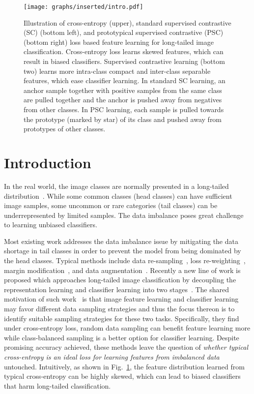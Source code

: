 \documentclass[final]{cvpr}
\begin{document}
\begin{figure}[t]
\begin{center}   
{
\texttt{[image: graphs/inserted/intro.pdf]}
}
\caption{Illustration of cross-entropy (upper), standard supervised contrastive (SC) (bottom left), and prototypical supervised contrastive (PSC) (bottom right) loss based feature learning for long-tailed image classification. Cross-entropy loss learns skewed features, which can result in biased classifiers. Supervised contrastive learning (bottom two) learns more intra-class compact and inter-class separable features, which ease classifier learning.  
In standard SC learning, an anchor sample together with positive samples from the same class are pulled together and the anchor is pushed away from negatives from other classes. In PSC learning, each sample is pulled towards the prototype (marked by star) of its class and pushed away from prototypes of other classes.} 
\label{fig:intro}
\end{center}
\end{figure}

\vspace*{-0.4cm}
\section{Introduction}

In the real world, the image classes are normally presented in a long-tailed distribution~\cite{openlt}. While some common classes (head classes) can have sufficient image samples, some uncommon or rare categories (tail classes) can be underrepresented by limited samples. The data imbalance poses great challenge to learning unbiased classifiers.


Most existing work addresses the data imbalance issue by mitigating the data shortage in tail classes in order to prevent the model from being dominated by the head classes. Typical methods include data re-sampling~\cite{imbalance1,imbalance2,imbalance3,SMOTE,more2016survey}, loss re-weighting~\cite{reweighting1,effnumber,ren18l2rw,equalloss}, margin modification~\cite{cao2019learning}, and data augmentation~\cite{m2m,feataug,GAMO}. Recently a new line of work is proposed which approaches long-tailed image classification by decoupling the representation learning and classifier learning into two stages~\cite{Decoupling,BBN,zhang2020balance}. The shared motivation of such work~\cite{Decoupling,BBN,zhang2020balance} is that image feature learning and classifier learning may favor different data sampling strategies and thus the focus thereon is to identify suitable sampling strategies for these two tasks. Specifically, they find under cross-entropy loss, random data sampling can benefit feature learning more while class-balanced sampling is a better option for classifier learning. 
Despite promising accuracy achieved, these methods leave the question of \emph{whether typical cross-entropy is an ideal loss for learning features from imbalanced data} untouched. Intuitively, as shown in Fig.~\ref{fig:intro}, the feature distribution learned from typical cross-entropy can be highly skewed, which can lead to biased classifiers~\cite{pmlr-v48-liud16,Huang_2016_CVPR} that harm long-tailed classification.  
\end{document}
